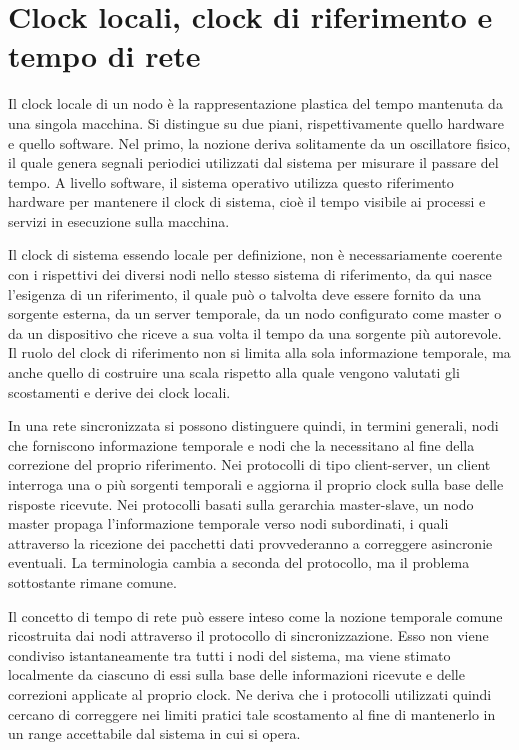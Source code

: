 \section{Clock locali, clock di riferimento e tempo di rete}
Il clock locale di un nodo è la rappresentazione plastica del tempo mantenuta da
una singola macchina. Si distingue su due piani, rispettivamente quello hardware
e quello software. Nel primo, la nozione deriva solitamente da un oscillatore
fisico, il quale genera segnali periodici utilizzati dal sistema per misurare il passare
del tempo. A livello software, il sistema operativo utilizza questo riferimento hardware
per mantenere il clock di sistema, cioè il tempo visibile ai processi e servizi
in esecuzione sulla macchina.

Il clock di sistema essendo locale per definizione, non è necessariamente coerente
con i rispettivi dei diversi nodi nello stesso sistema di riferimento, da qui
nasce l'esigenza di un riferimento, il quale può o talvolta deve essere fornito da
una sorgente esterna, da un server temporale, da un nodo configurato come master o
da un dispositivo che riceve a sua volta il tempo da una sorgente più autorevole.
Il ruolo del clock di riferimento non si limita alla sola informazione temporale,
ma anche quello di costruire una scala rispetto alla quale vengono valutati gli scostamenti
e derive dei clock locali.

In una rete sincronizzata si possono distinguere quindi, in termini generali, nodi
che forniscono informazione temporale e nodi che la necessitano al fine della correzione
del proprio riferimento. Nei protocolli di tipo client-server, un client interroga
una o più sorgenti temporali e aggiorna il proprio clock sulla base delle risposte
ricevute. Nei protocolli basati sulla gerarchia master-slave, un nodo master propaga
l'informazione temporale verso nodi subordinati, i quali attraverso la ricezione
dei pacchetti dati provvederanno a correggere asincronie eventuali. La terminologia
cambia a seconda del protocollo, ma il problema sottostante rimane comune.

Il concetto di tempo di rete può essere inteso come la nozione temporale comune
ricostruita dai nodi attraverso il protocollo di sincronizzazione. Esso non viene
condiviso istantaneamente tra tutti i nodi del sistema, ma viene stimato
localmente da ciascuno di essi sulla base delle informazioni ricevute e delle
correzioni applicate al proprio clock. Ne deriva che i protocolli utilizzati quindi
cercano di correggere nei limiti pratici tale scostamento al fine di mantenerlo in
un range accettabile dal sistema in cui si opera.

